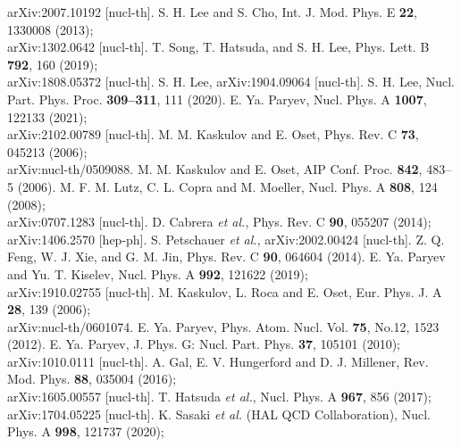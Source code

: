 \documentclass[12pt]{article}
\begin{document}
\begin{thebibliography}{99}
                             arXiv:2007.10192 [nucl-th].
 S. H. Lee and S. Cho, Int. J. Mod. Phys. E {\bf 22}, 1330008 (2013);\\
                            arXiv:1302.0642 [nucl-th].
 T. Song, T. Hatsuda, and S. H. Lee, Phys. Lett. B {\bf 792}, 160 (2019);\\
                            arXiv:1808.05372 [nucl-th].
 S. H. Lee, arXiv:1904.09064 [nucl-th].
 S. H. Lee, Nucl. Part. Phys. Proc. {\bf 309--311}, 111 (2020).
 E. Ya. Paryev, Nucl. Phys. A {\bf 1007}, 122133 (2021);\\
                            arXiv:2102.00789 [nucl-th].
 M. M. Kaskulov and E. Oset, Phys. Rev. C {\bf 73}, 045213 (2006);\\
                            arXiv:nucl-th/0509088.
 M. M. Kaskulov and E. Oset, AIP Conf. Proc. {\bf 842}, 483--5 (2006).
 M. F. M. Lutz, C. L. Copra and M. Moeller, Nucl. Phys. A {\bf 808}, 124 (2008);\\
                            arXiv:0707.1283 [nucl-th].
 D. Cabrera {\it et al.}, Phys. Rev. C {\bf 90}, 055207 (2014);\\
                            arXiv:1406.2570 [hep-ph].
 S. Petschauer {\it et al.}, arXiv:2002.00424 [nucl-th].
 Z. Q. Feng, W. J. Xie, and G. M. Jin, Phys. Rev. C {\bf 90}, 064604 (2014).
 E. Ya. Paryev and Yu. T. Kiselev, Nucl. Phys. A {\bf 992}, 121622 (2019);\\
                            arXiv:1910.02755 [nucl-th].
 M. Kaskulov, L. Roca and E. Oset, Eur. Phys. J. A {\bf 28}, 139 (2006);\\
                            arXiv:nucl-th/0601074.
 E. Ya. Paryev, Phys. Atom. Nucl. Vol. {\bf 75}, No.12, 1523 (2012).
 E. Ya. Paryev, J. Phys. G: Nucl. Part. Phys. {\bf 37}, 105101 (2010);\\
                            arXiv:1010.0111 [nucl-th].
 A. Gal, E. V. Hungerford and D. J. Millener, Rev. Mod. Phys. {\bf 88}, 035004 (2016);\\                                    arXiv:1605.00557 [nucl-th].
 T. Hatsuda {\it et al.}, Nucl. Phys. A {\bf 967}, 856 (2017);\\
                            arXiv:1704.05225 [nucl-th].
 K. Sasaki {\it et al.} (HAL QCD Collaboration), Nucl. Phys. A {\bf 998}, 121737 (2020);\\

\end{thebibliography}
\end{document}
